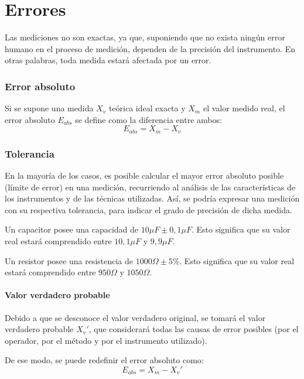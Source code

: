 

\chapter{Errores}

Las mediciones no son exactas, ya que, suponiendo que no exista ningún error humano en el proceso de medición, dependen de la precisión del instrumento. En otras palabras, toda medida estará afectada por un error.

\subsection{Error absoluto}
Si se supone una medida $X_v$ teórica ideal exacta y $X_m$ el valor medido real, el error absoluto $E_{abs}$ se define como la diferencia entre ambos: $$ E_{abs}= X_m-X_v $$

\subsection{Tolerancia}
En la mayoría de los casos, es posible calcular el mayor error absoluto posible (límite de error) en una medición, recurriendo al análisis de las características de los instrumentos y de las técnicas utilizadas. Así, se podría expresar una medición con su respectiva tolerancia, para indicar el grado de precisión de dicha medida.

\begin{ejemplo}
	Un capacitor posee una capacidad de $10 \mu F \pm 0,1 \mu F$. Esto significa que su valor real estará comprendido entre $10,1 \mu F$ y $9,9 \mu F$.
\end{ejemplo}

\begin{ejemplo}
	Un resistor posee una resistencia de $1000 \Omega \pm 5 \% $. Esto significa que su valor real estará comprendido entre $ 950 \Omega $ y $ 1050 \Omega $.
\end{ejemplo}

\subsubsection{Valor verdadero probable}
Debido a que se desconoce el valor verdadero original, se tomará el valor verdadero probable $X_v'$, que considerará todas las causas de error posibles (por el operador, por el método y por el instrumento utilizado).

De ese modo, se puede redefinir el error absoluto como: $$ E_{abs}= X_m-X_v' $$

